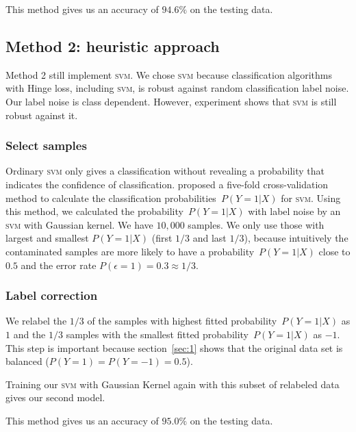 \documentclass[12pt]{article} %
\begin{document}
This method gives us an accuracy of $94.6\%$ on the testing data.

\subsection{Method 2: heuristic approach}\label{2nd}
Method 2 still implement \textsc{svm}. We chose \textsc{svm} because classification algorithms with Hinge loss, including \textsc{svm}, is robust against random classification label noise. Our label noise is class dependent. However, experiment shows that \textsc{svm} is still robust against it.

\subsubsection{Select samples}
Ordinary \textsc{svm} only gives a classification without revealing a probability that indicates the confidence of classification. \citet{Wu03probabilityestimates} proposed a five-fold cross-validation method to calculate the classification probabilities~$P(Y=1|X)$ for \textsc{svm}. 
Using this method, we calculated the probability~$P(Y=1|X)$ with label noise by an \textsc{svm} with Gaussian kernel. We have $10,000$ samples. We only use those with largest and smallest $P(Y=1|X)$ (first $1/3$ and last $1/3$), because intuitively the contaminated samples are more likely to have a probability~$P(Y=1|X)$ close to $0.5$ and the error rate $P(\epsilon=1)=0.3\approx 1/3$. %
\subsubsection{Label correction}
We relabel the $1/3$ of the samples with highest fitted probability~$P(Y=1|X)$ as $1$ and the $1/3$ samples with the smallest fitted probability~$P(Y=1|X)$ as $-1$. This step is important because section~\ref{sec:1} shows that the original data set is balanced ($P(Y=1)=P(Y=-1)=0.5$). 

Training our \textsc{svm} with Gaussian Kernel again with this subset of relabeled data gives our second model.

This method gives us an accuracy of $95.0\%$ on the testing data.
\end{document}

